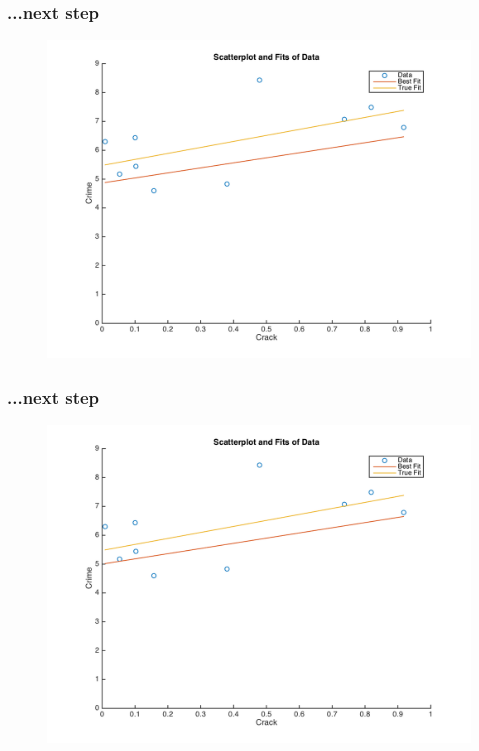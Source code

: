 \documentclass{beamer}
\begin{document}
\begin{frame}
\frametitle[alignment=center]{...next step}
\begin{figure}
\centering
\includegraphics[scale=0.5]{Newton_OLS_Figure_10.png}
\end{figure}
\end{frame}

\begin{frame}
\frametitle[alignment=center]{...next step}
\begin{figure}
\centering
\includegraphics[scale=0.5]{Newton_OLS_Figure_11.png}
\end{figure}
\end{frame}
\end{document}
